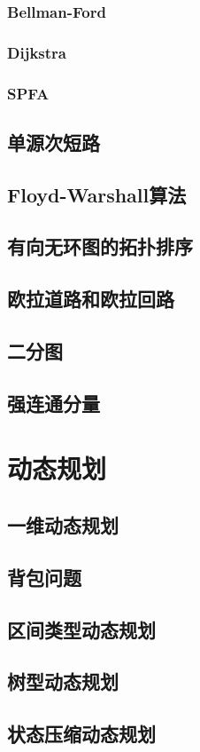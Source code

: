 \documentclass[12pt,twiside,a4paper]{ctexbook}
\numberwithin{chapter}{part}
\begin{document}
\subsection{Bellman-Ford}
\subsection{Dijkstra}
\subsection{SPFA}
\section{单源次短路}
\section{Floyd-Warshall算法}
\section{有向无环图的拓扑排序}
\section{欧拉道路和欧拉回路}
\section{二分图}
\section{强连通分量}

\chapter{动态规划}
\section{一维动态规划}
\section{背包问题}
\section{区间类型动态规划}

\section{树型动态规划}

\section{状态压缩动态规划}

\clearpage
\end{document}
